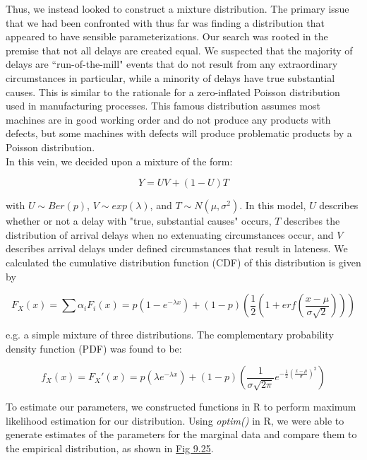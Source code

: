 \documentclass[12pt, a4paper, openany]{book}
\newcommand\tab[1][1cm]{\hspace*{#1}}
\begin{document}
	\tab Thus, we instead looked to construct a mixture distribution. The primary issue that we had been confronted with thus far was finding a distribution that appeared to have sensible parameterizations.  Our search was rooted in the premise that not all delays are created equal. We suspected that the majority of delays are “run-of-the-mill" events that do not result from any extraordinary circumstances in particular, while a minority of delays have true substantial causes. This is similar to the rationale for a zero-inflated Poisson distribution used in manufacturing processes. This famous distribution assumes most machines are in good working order and do not produce any products with defects, but some machines with defects will produce problematic products by a Poisson distribution. \\
	\tab In this vein, we decided upon a mixture of the form: \begin{center}$$Y = UV + (1-U)T$$\end{center} with $U\sim Ber(p)$, $V\sim exp(\lambda)$, and $T\sim  N(\mu,\sigma^2)$. In this model, $U$ describes whether or not a delay with "true, substantial causes" occurs, $T$ describes the distribution of arrival delays when no extenuating circumstances occur, and $V$ describes arrival delays under defined circumstances that result in lateness. We calculated the cumulative distribution function (CDF) of this distribution is given by 
	\begin{center}$$F_X(x) = \sum \alpha_i F_i(x) = p(1-e^{-\lambda x}) + (1-p)\left(\frac{1}{2}(1+ erf(\frac{x-\mu}{\sigma\sqrt{2}}))\right)$$\end{center}
	e.g. a simple mixture of three distributions. The complementary probability density function (PDF) was found to be: \begin{center}
	$$f_X(x) = F_X'(x) = p(\lambda e^{-\lambda x} ) + (1-p)\left(\frac{1}{\sigma \sqrt{2\pi}} e^{-\frac{1}{2}(\frac{x-\mu}{\sigma})^2}\right)$$
	\end{center}
	To estimate our parameters, we constructed functions in R to perform maximum likelihood estimation for our distribution.  Using \textit{optim()} in R, we were able to generate estimates of the parameters for the marginal data and compare them to the empirical distribution, as shown in \underline{Fig 9.25}.\\
\end{document}
